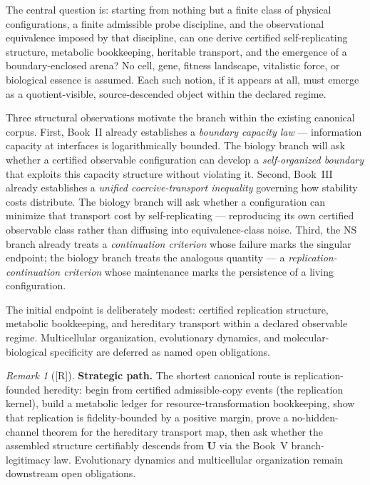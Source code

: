 \documentclass[12pt,oneside]{amsbook}
\theoremstyle{plain}
\theoremstyle{definition}
\theoremstyle{remark}
\newtheorem{remark}[theorem]{Remark}
\newcommand{\status}[1]{\textup{[#1]}}
\begin{document}
The central question is: starting from nothing but a finite class of
physical configurations, a finite admissible probe discipline, and the
observational equivalence imposed by that discipline, can one derive
certified self-replicating structure, metabolic bookkeeping, heritable
transport, and the emergence of a boundary-enclosed arena? No cell,
gene, fitness landscape, vitalistic force, or biological essence is
assumed. Each such notion,
if it appears at all, must emerge as a quotient-visible,
source-descended object within the declared regime.

Three structural observations motivate the branch within the existing
canonical corpus. First, Book~II already establishes a
\emph{boundary capacity law} --- information capacity at interfaces is
logarithmically bounded. The biology branch will ask whether a
certified observable configuration can develop a \emph{self-organized
boundary} that exploits this capacity structure without violating it.
Second, Book~III already establishes a \emph{unified coercive-transport
inequality} governing how stability costs distribute. The biology
branch will ask whether a configuration can minimize that transport
cost by self-replicating --- reproducing its own certified observable
class rather than diffusing into equivalence-class noise. Third, the
NS branch already treats a \emph{continuation criterion} whose failure
marks the singular endpoint; the biology branch treats the analogous
quantity --- a \emph{replication-continuation criterion} whose
maintenance marks the persistence of a living configuration.

The initial endpoint is deliberately modest: certified replication
structure, metabolic bookkeeping, and hereditary transport within a
declared observable regime. Multicellular organization, evolutionary
dynamics, and molecular-biological specificity are deferred as named
open obligations.

\begin{remark}[\status{R}]\label{rem:bio-strategic-path}
\textbf{Strategic path.}
The shortest canonical route is replication-founded heredity: begin
from certified admissible-copy events (the replication kernel), build
a metabolic ledger for resource-transformation bookkeeping, show that
replication is fidelity-bounded by a positive margin, prove a
no-hidden-channel theorem for the hereditary transport map, then ask
whether the assembled structure certifiably descends from $\mathbf{U}$
via the Book~V branch-legitimacy law. Evolutionary dynamics and
multicellular organization remain downstream open obligations.
\end{remark}
\end{document}
